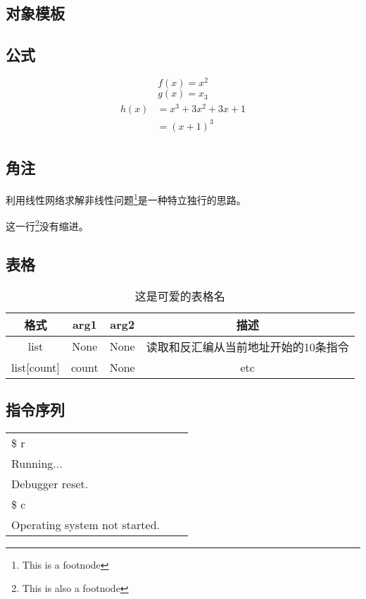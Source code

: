 \documentclass{article}
\begin{document}
\begin{spacing}{1.4}

\section{对象模板}
\subsection{公式}
$$f(x)=x^2$$
$$g(x)=x_3$$
\begin{eqnarray}
\begin{split}
h(x)&=x^3+3x^2+3x+1 \\
&=(x+1)^3
\end{split}
\end{eqnarray}

\subsection{角注}
\indent 利用线性网络求解非线性问题\footnote{This is a footnode}是一种特立独行的思路。

\noindent 这一行\footnote{This is also a footnode}没有缩进。
\subsection{表格}
\begin{table}[!htb]
\begin{center}
\begin{tabular*}{15cm}{c|c|c|c}  
\hline  
\textbf{格式}&\textbf{arg1}&\textbf{arg2}&\textbf{描述} \\
\hline
list & None & None &读取和反汇编从当前地址开始的10条指令 \\
\hline
list[count] & count & None & etc \\
\hline 
\end{tabular*}  
\caption{这是可爱的表格名}
\end{center}
\end{table}

\subsection{指令序列}
\begin{table}[!htb]
\begin{center}
\begin{tabular*}{15cm}{lll}  
\hline  
\$ r\\
Running...\\
Debugger reset.\\
\$ c\\
Operating system not started.\\
\hline  
\end{tabular*}  
\end{center}
\end{table}


\end{spacing}
\end{document}

